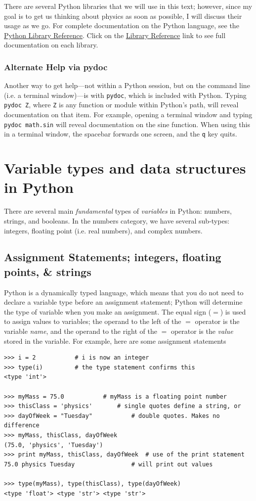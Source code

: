 There are several Python libraries that we will use in this text; however,  since my goal is to get us thinking about physics as soon as possible, I will discuss their usage as we go. For complete documentation on the Python language, see the  \href{http://docs.python.org/}{Python Library Reference}. Click on the \href{http://docs.python.org/2/library/index.html}{Library Reference} link to see full documentation on each library. 

\subsubsection{Alternate Help via pydoc}
\label{sec:pydoc}
Another way to get help---not within a Python session, but on the command line (i.e. a terminal window)---is with \verb!pydoc!, which is included with Python. Typing \verb!pydoc Z!, where \verb!Z! is any function or module within Python's path, will reveal documentation on that item. For example, opening a terminal window and typing \verb!pydoc math.sin!
will reveal documentation on the sine function. When using this in a terminal window, the spacebar forwards one screen, and the \texttt{q} key quits. 

\section{Variable types and data structures in Python}
\label{sec-datatypes}
There are several main \textit{fundamental} types of \textit{variables} in Python: numbers, strings, and booleans. In the numbers category, we have several sub-types: integers, floating point (i.e. real numbers), and complex numbers. 

\subsection{Assignment Statements; integers, floating points, \& strings}
Python is a dynamically typed language, which means that you do not need to declare a variable type before an assignment statement; Python will determine the type of variable when you make an assignment. The equal sign ($=$) is used to assign values to variables; the operand to the left of the $=$ operator is the variable \textit{name}, and the operand to the right of the $=$ operator is the \textit{value} stored in the variable. For example, here are some assignment statements 

\begin{lstlisting}[style = pythonSnippet]
>>> i = 2 			# i is now an integer
>>> type(i)			# the type statement confirms this
<type 'int'>

>>> myMass = 75.0			# myMass is a floating point number
>>> thisClass = 'physics'		# single quotes define a string, or
>>> dayOfWeek = "Tuesday"   	  	# double quotes. Makes no difference
>>> myMass, thisClass, dayOfWeek
(75.0, 'physics', 'Tuesday')
>>> print myMass, thisClass, dayOfWeek	# use of the print statement
75.0 physics Tuesday				# will print out values

>>> type(myMass), type(thisClass), type(dayOfWeek)
<type 'float'> <type 'str'> <type 'str'>
\end{lstlisting}

